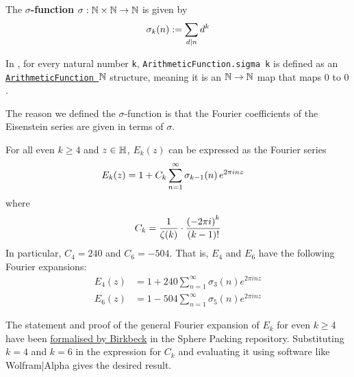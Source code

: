 \begin{boxdefinition}
    The \textbf{$\sigma$-function} $\sigma : \mathbb{N} \times \mathbb{N} \to \mathbb{N}$ is given by
    \begin{align*}
        \sigma_k\!\left( n \right) := \sum_{d \mid n} d^k
    \end{align*}
\end{boxdefinition}

In \mathlib, for every natural number \texttt{k}, \texttt{ArithmeticFunction.sigma k} is defined as an \href{https://github.com/leanprover-community/mathlib4/blob/bc10be4a66942c0fc2547b54f7f8715df72ff28c/Mathlib/NumberTheory/ArithmeticFunction.lean#L76-L80}{\texttt{ArithmeticFunction $\mathbb{N}$}} structure, meaning it is an $\mathbb{N} \to \mathbb{N}$ map that maps $0$ to $0$.

The reason we defined the $\sigma$-function is that the Fourier coefficients of the Eisenstein series are given in terms of $\sigma$.

\begin{boxtheorem}\label{Ch2:Thm:Ek_qexpansion}
    For all even $k \geq 4$ and $z \in \mathbb{H}$, $E_k(z)$ can be expressed as the Fourier series
    \begin{align}
        E_k(z) &= 1 + C_k \sum_{n=1}^{\infty} \sigma_{k-1}\!\left( n \right) e^{2\pi i n z}
        \label{Ch2:Eq:Ek_qexpansion}
    \end{align}
    where
    \begin{align}
        C_k = \frac{1}{\zeta(k)} \cdot \frac{\left( -2 \pi i \right)^k}{\left( k-1 \right)!}
        \label{Ch2:Eq:Ck_Ek_qexpansion_const}
    \end{align}
    In particular, $C_4 = 240$ and $C_6 = -504$. That is, $E_4$ and $E_6$ have the following Fourier expansions:
    \begin{align}
        E_4(z) &= 1 + 240 \sum_{n=1}^{\infty} \sigma_3(n) e^{2 \pi i n z} \label{Ch2:Eq:E4_qexpansion} \\
        E_6(z) &= 1 - 504 \sum_{n=1}^{\infty} \sigma_5(n) e^{2 \pi i n z} \label{Ch2:Eq:E6_qexpansion}
    \end{align}
\end{boxtheorem}

The statement and proof of the general Fourier expansion of $E_k$ for even $k \geq 4$ have been \href{https://github.com/thefundamentaltheor3m/Sphere-Packing-Lean/blob/076f4b8d6a37fa95de3bc4764a5d7f911fde91e0/SpherePacking/ModularForms/Eisensteinqexpansions.lean#L301}{formalised by Birkbeck} in the Sphere Packing repository. Substituting $k = 4$ and $k = 6$ in the expression for $C_k$ and evaluating it using software like Wolfram|Alpha gives the desired result.

